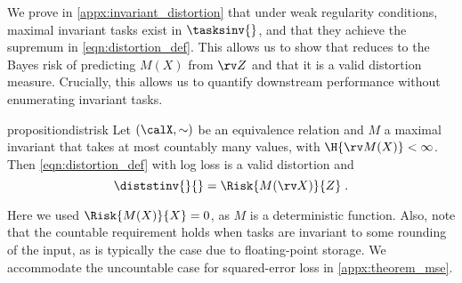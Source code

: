 \documentclass[final]{article}
\begin{document}
We prove in \cref{appx:invariant_distortion} that under weak regularity conditions, maximal invariant tasks exist in $\tasksinv{}$, and that they achieve the supremum in \cref{eqn:distortion_def}.
This allows us to show that \disttextinv{} reduces to the Bayes risk of predicting $M(X)$ from $\rv Z$ and that it is a valid distortion measure. Crucially, this allows us to quantify downstream performance without enumerating invariant tasks.
\begin{restatable}{proposition}{distrisk}
\label{prop:nicer_dist}
Let $(\calX,\sim)$ be an equivalence relation and $M$ a maximal invariant that takes at most countably many values, with $\H{\rv M(X)} < \infty$.
Then \disttextinv{} \eqref{eqn:distortion_def} with log loss is a valid distortion and
\begin{equation}\label{eqn:max_invariance_distortion}
\diststinv{}{} = \Risk{M(\rv X)}{Z} \;.
\end{equation}
\end{restatable}

Here we used $\Risk{M(X)}{X}=0$, as $M$ is a deterministic function.  
Also, note that the countable requirement holds when tasks are invariant to some rounding of the input, as is typically the case due to floating-point storage.
We accommodate the uncountable case for squared-error loss in \cref{appx:theorem_mse}.
\end{document}
